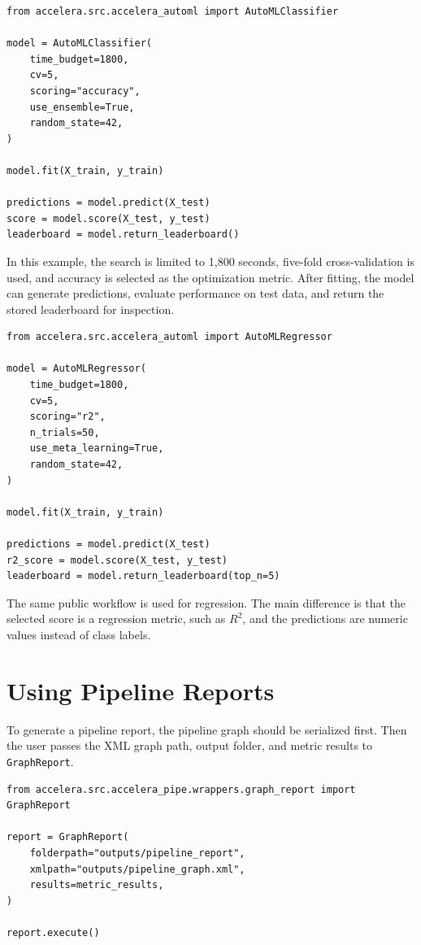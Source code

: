 \documentclass[12pt,a4paper]{report}
\begin{document}
\begin{lstlisting}[style=code,caption={Basic AutoML classification workflow}]
from accelera.src.accelera_automl import AutoMLClassifier

model = AutoMLClassifier(
    time_budget=1800,
    cv=5,
    scoring="accuracy",
    use_ensemble=True,
    random_state=42,
)

model.fit(X_train, y_train)

predictions = model.predict(X_test)
score = model.score(X_test, y_test)
leaderboard = model.return_leaderboard()
\end{lstlisting}

\noindent In this example, the search is limited to 1,800 seconds, five-fold
cross-validation is used, and accuracy is selected as the optimization metric.
After fitting, the model can generate predictions, evaluate performance on test
data, and return the stored leaderboard for inspection.

\begin{lstlisting}[style=code,caption={Basic AutoML regression workflow}]
from accelera.src.accelera_automl import AutoMLRegressor

model = AutoMLRegressor(
    time_budget=1800,
    cv=5,
    scoring="r2",
    n_trials=50,
    use_meta_learning=True,
    random_state=42,
)

model.fit(X_train, y_train)

predictions = model.predict(X_test)
r2_score = model.score(X_test, y_test)
leaderboard = model.return_leaderboard(top_n=5)
\end{lstlisting}

\noindent The same public workflow is used for regression. The main difference
is that the selected score is a regression metric, such as $R^2$, and the
predictions are numeric values instead of class labels.

\section{Using Pipeline Reports}
To generate a pipeline report, the pipeline graph should be serialized first.
Then the user passes the XML graph path, output folder, and metric results to
\texttt{GraphReport}.

\begin{lstlisting}[style=code,caption={Calling the pipeline graph report}]
from accelera.src.accelera_pipe.wrappers.graph_report import GraphReport

report = GraphReport(
    folderpath="outputs/pipeline_report",
    xmlpath="outputs/pipeline_graph.xml",
    results=metric_results,
)

report.execute()
\end{lstlisting}
\end{document}
